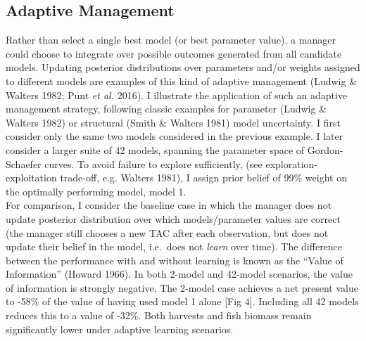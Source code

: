 \documentclass[3p]{elsarticle} %
\begin{document}
\hypertarget{adaptive-management}{%
\subsection{Adaptive Management}\label{adaptive-management}}

Rather than select a single best model (or best parameter value), a
manager could choose to integrate over possible outcomes generated from
all candidate models. Updating posterior distributions over parameters
and/or weights assigned to different models are examples of this kind of
adaptive management (Ludwig \& Walters 1982; Punt \emph{et al.} 2016). I
illustrate the application of such an adaptive management strategy,
following classic examples for parameter (Ludwig \& Walters 1982) or
structural (Smith \& Walters 1981) model uncertainty. I first consider
only the same two models considered in the previous example. I later
consider a larger suite of 42 models, spanning the parameter space of
Gordon-Schaefer curves. To avoid failure to explore sufficiently, (see
exploration-exploitation trade-off, e.g. Walters 1981), I assign prior
belief of 99\% weight on the optimally performing model, model 1.\\
For comparison, I consider the baseline case in which the manager does
not update posterior distribution over which models/parameter values are
correct (the manager still chooses a new TAC after each observation, but
does not update their belief in the model, i.e.~does not \emph{learn}
over time). The difference between the performance with and without
learning is known as the ``Value of Information'' (Howard 1966). In both
2-model and 42-model scenarios, the value of information is strongly
negative. The 2-model case achieves a net present value to -58\% of the
value of having used model 1 alone {[}Fig 4{]}. Including all 42 models
reduces this to a value of -32\%. Both harvests and fish biomass remain
significantly lower under adaptive learning scenarios.
\end{document}
